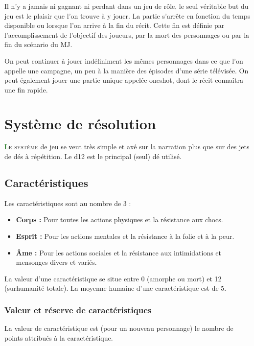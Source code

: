 \documentclass[twoside,12pt,english]{book}
\newcommand*\initfamily{\usefont{U}{Acorn}{xl}{n}}
\begin{document}
Il n’y a jamais ni gagnant ni perdant dans un jeu de rôle, le seul véritable but du jeu est le plaisir que l’on trouve à y jouer. La partie s’arrête en fonction du temps disponible ou lorsque l’on arrive à la fin du récit. Cette fin est définie par l’accomplissement de l’objectif des joueurs, par la mort des personnages ou par la fin du scénario du MJ.

On peut continuer à jouer indéfiniment les mêmes personnages dans ce que l’on appelle une campagne, un peu à la manière des épisodes d’une série télévisée. On peut également jouer une partie unique appelée oneshot, dont le récit connaîtra une fin rapide.

\newpage

\section{Système de résolution}

\lettrine[lines=3]{\initfamily\textcolor{darkgreen}{L}}{e système} de jeu se veut très simple et axé sur la narration plus que sur des jets de dés à répétition. Le d12 est le principal (seul) dé utilisé. 

\subsection{Caractéristiques}

Les caractéristiques sont au nombre de 3 :

\begin{itemize}
	\item \textbf{Corps :} Pour toutes les actions physiques et la résistance aux chocs.
	\item \textbf{Esprit :} Pour les actions mentales et la résistance à la folie et à la peur.
	\item \textbf{Âme :} Pour les actions sociales et la résistance aux intimidations et mensonges divers et variés.
\end{itemize}

La valeur d'une caractéristique se situe entre 0 (amorphe ou mort) et 12 (surhumanité totale). La moyenne humaine d'une caractéristique est de 5.

\subsubsection*{Valeur et réserve de caractéristiques}

La valeur de caractéristique est (pour un nouveau personnage) le nombre de points attribués à la caractéristique.
\end{document}
